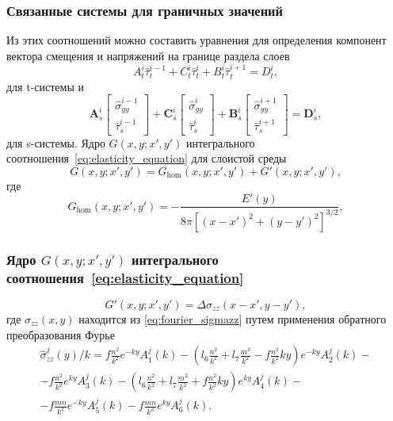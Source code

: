 \begin{frame}
    \frametitle{Связанные системы для граничных значений}
    Из этих соотношений можно составить уравнения для определения компонент вектора смещения и напряжений на границе раздела слоев
    \begin{equation}
        \label{eq:coupled_t-system}
        A_t^i \hat{\tau}_t^{i-1} + C_t^i \hat{\tau}_t^{i} + B_t^i \hat{\tau}_t^{i+1} = D_t^i,
    \end{equation}
    для t-системы и 
    \begin{equation}
        \label{eq:coupled_s-system}
        \textbf{A}_s^i \left[
            \begin{array}{c}
                \hat{\sigma}_{yy}^{i-1} \\
                \hat{\tau}_s^{i-1}
            \end{array}\right] +
        \textbf{C}_s^i \left[
            \begin{array}{c}
                \hat{\sigma}_{yy}^{i} \\
                \hat{\tau}_s^{i}
            \end{array}\right] + 
        \textbf{B}_s^i \left[
            \begin{array}{c}
                \hat{\sigma}_{yy}^{i+1} \\
                \hat{\tau}_s^{i+1}
            \end{array}\right]
        = \textbf{D}_s^i,
    \end{equation}
    для s-системы.
    Ядро $G(x,y;x',y')$ интегрального соотношения~\eqref{eq:elasticity_equation} для слоистой среды
    \begin{equation}
        G(x,y;x',y') = G_\text{hom}(x,y;x',y') + G'(x,y;x',y'),
    \end{equation} 
    где
    \begin{equation}
        \label{eq:elasticity_kernel}
        G_\text{hom}(x,y;x',y') = - \frac{E'(y)}{8\pi [(x\!-\!x')^2+(y\!-\!y')^2]^{3/2}},
    \end{equation}
\end{frame}

\begin{frame}
    \frametitle{Ядро $G(x,y;x',y')$ интегрального соотношения~\eqref{eq:elasticity_equation}}
    \begin{equation}
        G'(x,y;x',y') = \Delta \sigma_{zz}(x-x',y-y'),
    \end{equation}
    где $\sigma_{zz}(x,y)$ находится из \eqref{eq:fourier_sigmazz} путем применения обратного преобразования Фурье
    \begin{multline}
        \label{eq:fourier_sigmazz}
        \hat{\sigma}^j_{zz}(y)/k = f\frac{n^2}{k^2}e^{-ky}A^j_1(k)
        - \left(l_6\frac{n^2}{k^2}+l_7\frac{m^2}{k^2}-f\frac{n^2}{k^2}ky \right)e^{-ky}A^j_2(k) - \\
        - f\frac{n^2}{k^2}e^{ky}A^j_3(k)
        - \left(l_6\frac{n^2}{k^2}+l_7\frac{m^2}{k^2}+f\frac{n^2}{k^2}ky \right)e^{ky}A^j_4(k) - \\
        - f\frac{mn}{k^2}e^{-ky}A^j_5(k)
        - f\frac{mn}{k^2}e^{ky}A^j_6(k).
    \end{multline}
\end{frame}

